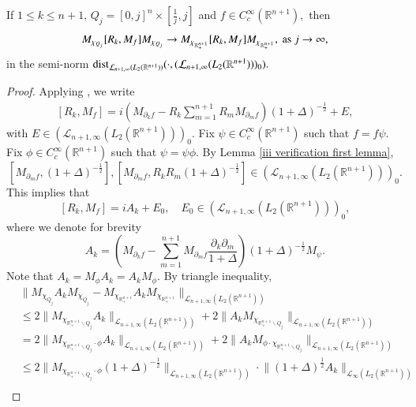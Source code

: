 \documentclass[12pt]{amsart}
\begin{document}
\begin{lemma}\label{ii verification lemma} If $1\leq k\leq n+1$, $Q_j=[0,j]^n\times[\frac1j,j]$ and $f\in C^{\infty}_c(\mathbb{R}^{n+1}),$ then
$$M_{\chi_{Q_j}}[R_k,M_f]M_{\chi_{Q_j}}\to M_{\chi_{\mathbb{R}^{n+1}_+}}[R_k,M_f]M_{\chi_{\mathbb{R}^{n+1}_+}},\ {\rm as}\ j\rightarrow \infty,$$
in the semi-norm ${\rm dist}_{\mathcal{L}_{n+1,\infty}(L_2(\mathbb{R}^{n+1}))}(\cdot,(\mathcal{L}_{n+1,\infty}(L_2(\mathbb{R}^{n+1})))_0).$
\end{lemma}
\begin{proof} Applying \cite[Theorem 6.3.1]{LSZ2}, we write
\begin{align}\label{equ00}
[R_k,M_f]=i\left(M_{\partial_k f}-R_k\sum_{m=1}^{n+1}R_mM_{\partial_m f}\right)(1+\Delta)^{-\frac12}+E,
\end{align}
with $E\in (\mathcal{L}_{n+1,\infty}(L_2(\mathbb{R}^{n+1})))_0.$ Fix $\psi\in C^{\infty}_c(\mathbb{R}^{n+1})$ such that $f=f\psi.$ Fix $\phi\in C^{\infty}_c(\mathbb{R}^{n+1})$ such that $\psi=\psi\phi.$ By Lemma \ref{iii verification first lemma},
$$[M_{\partial_mf},(1+\Delta)^{-\frac12}],[M_{\partial_mf},R_kR_m(1+\Delta)^{-\frac12}]\in (\mathcal{L}_{n+1,\infty}(L_2(\mathbb{R}^{n+1})))_0.$$
This implies that
$$[R_k,M_f]=iA_k+E_0,\quad E_0\in (\mathcal{L}_{n+1,\infty}(L_2(\mathbb{R}^{n+1})))_0,$$
where we denote for brevity
$$A_k=\left(M_{\partial_k f}-\sum_{m=1}^{n+1}M_{\partial_m f}\frac{\partial_k\partial_m}{1+\Delta}\right)(1+\Delta)^{-\frac12}M_{\psi}.$$
Note that $A_k=M_{\phi}A_k=A_kM_{\phi}.$ By triangle inequality,
\begin{align*}
&\Big\|M_{\chi_{Q_j}}A_kM_{\chi_{Q_j}}-M_{\chi_{\mathbb{R}^{n+1}_+}}A_k M_{\chi_{\mathbb{R}^{n+1}_+}}\Big\|_{\mathcal{L}_{n+1,\infty}(L_2(\mathbb{R}^{n+1}))}\\
&\leq 2\Big\|M_{\chi_{\mathbb{R}^{n+1}_+\backslash Q_j}}A_k\Big\|_{\mathcal{L}_{n+1,\infty}(L_2(\mathbb{R}^{n+1}))}+2\Big\|A_kM_{\chi_{\mathbb{R}^{n+1}_+\backslash Q_j}}\Big\|_{\mathcal{L}_{n+1,\infty}(L_2(\mathbb{R}^{n+1}))}\\
&=2\Big\|M_{\chi_{\mathbb{R}^{n+1}_+\backslash Q_j}\cdot\phi}A_k\Big\|_{\mathcal{L}_{n+1,\infty}(L_2(\mathbb{R}^{n+1}))}+2\Big\|A_kM_{\phi\cdot\chi_{\mathbb{R}^{n+1}_+\backslash Q_j}}\Big\|_{\mathcal{L}_{n+1,\infty}(L_2(\mathbb{R}^{n+1}))}\\
&\leq 2\Big\|M_{\chi_{\mathbb{R}^{n+1}_+\backslash Q_j}\cdot\phi}(1+\Delta)^{-\frac12}\Big\|_{\mathcal{L}_{n+1,\infty}(L_2(\mathbb{R}^{n+1}))}\cdot \Big\|(1+\Delta)^{\frac12}A_k\Big\|_{\mathcal{L}_{\infty}(L_2(\mathbb{R}^{n+1}))}\\

\end{align*}
\end{proof}
\end{document}
